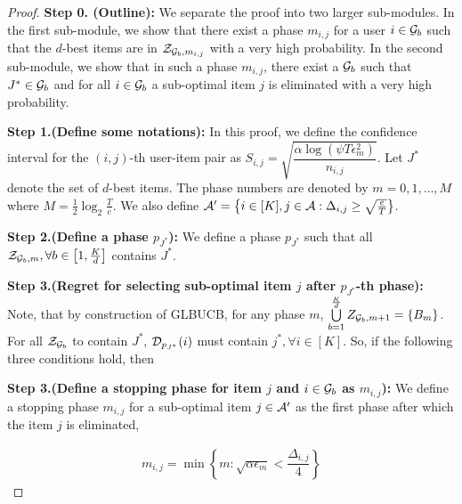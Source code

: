 \begin{proof}

\textbf{Step 0. (Outline):} We separate the proof into two larger sub-modules. In the first sub-module, we show that there exist a phase $m_{i,j}$ for a user $i\in\mathcal{G}_b$ such that the $d$-best items are in $\mathcal{Z}_{\mathcal{G}_b, m_{i,j}}$ with a very high probability. In the second sub-module, we show that in such a phase $m_{i,j}$, there exist a $\mathcal{G}_{b}$ such that $J^*\in\mathcal{G}_b$ and for all $i\in\mathcal{G}_b$ a sub-optimal item $j$ is eliminated with a very high probability.

\textbf{Step 1.(Define some notations):} In this proof,  we define the confidence interval for the $(i,j)$-th user-item pair as $S_{i,j}=\sqrt{\dfrac{\alpha\log(\psi T\epsilon_m^2)}{n_{i,j}}}$. Let $J^*$ denote the set of $d$-best items. The phase numbers are denoted by $m=0,1,\ldots,M$ where $M=\frac{1}{2}\log_{2}\frac{T}{e}$. We also define $\mathcal{A}'=\big\lbrace i\in[K], j\in\mathcal{A}: \Delta_{i,j}\geq \sqrt{\frac{e}{T}} \big\rbrace$.

\textbf{Step 2.(Define a phase $p_{J^*}$):} We define a phase $p_{J^*}$ such that all $\mathcal{Z}_{\mathcal{G}_b,m}, \forall b\in\left[ 1,\frac{K}{d}\right]$ contains $J^*$.

\textbf{Step 3.(Regret for selecting sub-optimal item $j$ after  $p_{J^*}$-th phase):} Note, that by construction of GLBUCB, for any phase $m$, $\bigcup\limits_{b=1}^{\frac{K}{d}}Z_{\mathcal{G}_b,m+1} = \lbrace B_m\rbrace$. For all $\mathcal{Z}_{\mathcal{G}_b}$ to contain $J^*$, $\mathcal{D}_{p_{J^*}}(i)$ must contain $j^*,\forall i\in[K]$. So, if the following three conditions hold, then 



\textbf{Step 3.(Define a stopping phase for item $j$ and $i\in\mathcal{G}_b$ as  $m_{i,j}$):} We define a stopping phase $m_{i,j}$ for a sub-optimal item $j\in\mathcal{A}'$ as the first phase after which the item $j$ is eliminated,

\begin{align*}                                                                                                                                                                                                                                                                                                                                                                                                                                                                                                                                                                                                                                                                                                                                                                                                                                                                     
m_{i,j} = \min\left\lbrace m: \sqrt{\alpha\epsilon_{m}} < \dfrac{\Delta_{i,j}}{4} \right\rbrace
\end{align*} 


\end{proof}

